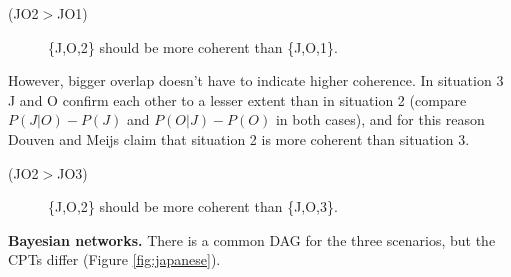 \documentclass[
  10pt,
]{scrartcl}
\newcommand{\s}[1]{\textsf{#1}}
\begin{document}
\vspace{2mm}\begin{description}
    \item[(\s{JO2}$>$\s{JO1})]  \{\s{J,O,2}\} should be more coherent than \{\s{J,O,1}\}.
\end{description}\vspace{2mm}

However, bigger overlap doesn't have to indicate higher coherence. In situation 3 \s{J} and \s{O} confirm each other to a lesser extent than in situation 2 (compare \(P(J|O)-P(J)\) and \(P(O|J)-P(O)\) in both cases), and for this reason Douven and Meijs claim that situation 2 is more coherent than situation 3.
\vspace{2mm}

\begin{description}
    \item[(\s{JO2}$>$\s{JO3})]  \{\s{J,O,2}\} should be more coherent than \{\s{J,O,3}\}.
\end{description}\vspace{2mm}

\textbf{Bayesian networks.} There is a common DAG for the three scenarios, but the CPTs differ (Figure \ref{fig:japanese}).
\end{document}
